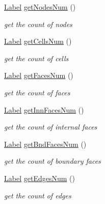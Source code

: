 \begin{DoxyCompactItemize}
\hyperlink{namespaceHSF_ae65d72be782e989396ebe5ec6ae4c2b6}{Label} \hyperlink{classHSF_1_1Topology_a9a62513cf2963da4ab2bf58d46d6d9f7}{getNodesNum} ()
\begin{DoxyCompactList}\small\item\em get the count of nodes \item\end{DoxyCompactList}\item 
\hyperlink{namespaceHSF_ae65d72be782e989396ebe5ec6ae4c2b6}{Label} \hyperlink{classHSF_1_1Topology_ae29fdf46363c034e08ba9a7b6eaeb912}{getCellsNum} ()
\begin{DoxyCompactList}\small\item\em get the count of cells \item\end{DoxyCompactList}\item 
\hyperlink{namespaceHSF_ae65d72be782e989396ebe5ec6ae4c2b6}{Label} \hyperlink{classHSF_1_1Topology_ad9ec7de46508d5c6f2d3307b84c2bcb0}{getFacesNum} ()
\begin{DoxyCompactList}\small\item\em get the count of faces \item\end{DoxyCompactList}\item 
\hyperlink{namespaceHSF_ae65d72be782e989396ebe5ec6ae4c2b6}{Label} \hyperlink{classHSF_1_1Topology_a7b260fdf67cfe1290b8302fa46b79e70}{getInnFacesNum} ()
\begin{DoxyCompactList}\small\item\em get the count of internal faces \item\end{DoxyCompactList}\item 
\hyperlink{namespaceHSF_ae65d72be782e989396ebe5ec6ae4c2b6}{Label} \hyperlink{classHSF_1_1Topology_a14bba9407c2c026f94acbd9915bfa2a0}{getBndFacesNum} ()
\begin{DoxyCompactList}\small\item\em get the count of boundary faces \item\end{DoxyCompactList}\item 
\hyperlink{namespaceHSF_ae65d72be782e989396ebe5ec6ae4c2b6}{Label} \hyperlink{classHSF_1_1Topology_aacb3bbf08010f13016ac3db329f18bb8}{getEdgesNum} ()
\begin{DoxyCompactList}\small\item\em get the count of edges \item\end{DoxyCompactList}\item 

\end{DoxyCompactItemize}
